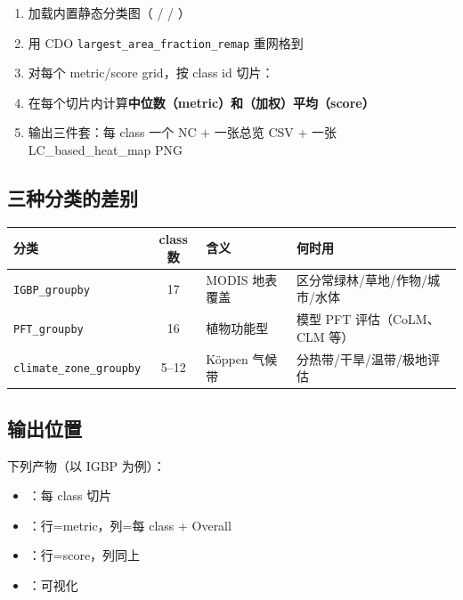 \begin{enumerate}
  \item 加载内置静态分类图（ /  / ）
  \item 用 CDO \texttt{largest\_area\_fraction\_remap} 重网格到 
  \item 对每个 metric/score grid，按 class id 切片：
  \item 在每个切片内计算\textbf{中位数（metric）和（加权）平均（score）}
  \item 输出三件套：每 class 一个 NC + 一张总览 CSV + 一张 LC\_based\_heat\_map PNG
\end{enumerate}

\subsection{三种分类的差别}

\begin{center}
\begin{tabular}{|l|c|p{4cm}|p{4cm}|}
\hline
\textbf{分类} & \textbf{class 数} & \textbf{含义} & \textbf{何时用} \\
\hline
\texttt{IGBP\_groupby} & 17 & MODIS 地表覆盖 & 区分常绿林/草地/作物/城市/水体 \\
\hline
\texttt{PFT\_groupby}  & 16 & 植物功能型 & 模型 PFT 评估（CoLM、CLM 等） \\
\hline
\texttt{climate\_zone\_groupby} & 5--12 & K\"oppen 气候带 & 分热带/干旱/温带/极地评估 \\
\hline
\end{tabular}
\end{center}

\subsection{输出位置}


下列产物（以 IGBP 为例）：

\begin{itemize}
  \item {}：每 class 切片
  \item {}：行=metric，列=每 class + Overall
  \item {}：行=score，列同上
  \item {}：可视化
\end{itemize}

